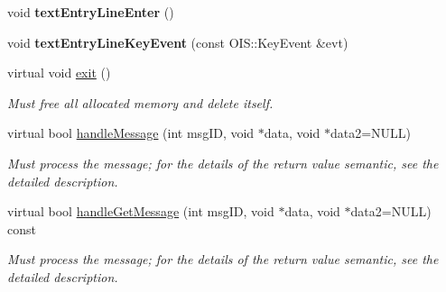\begin{DoxyCompactItemize}
\item 
\hypertarget{classComponentPlayer_a58c21cd8acfdd3244c7de3c7edd40e50}{
void {\bfseries text\-Entry\-Line\-Enter} ()}
\label{d5/d28/classComponentPlayer_a58c21cd8acfdd3244c7de3c7edd40e50}

\item 
\hypertarget{classComponentPlayer_ac450ea4fc6a7e8d9fb7d05b4cdcd2882}{
void {\bfseries text\-Entry\-Line\-Key\-Event} (const \-O\-I\-S\-::\-Key\-Event \&evt)}
\label{d5/d28/classComponentPlayer_ac450ea4fc6a7e8d9fb7d05b4cdcd2882}

\item 
\hypertarget{classComponentPlayer_ac4496f255396b1dbe6dfbc3b03c38b64}{
virtual void \hyperlink{classComponentPlayer_ac4496f255396b1dbe6dfbc3b03c38b64}{exit} ()}
\label{d5/d28/classComponentPlayer_ac4496f255396b1dbe6dfbc3b03c38b64}

\begin{DoxyCompactList}\small\item\em \-Must free all allocated memory and delete itself. \end{DoxyCompactList}\item 
virtual bool \hyperlink{classComponentPlayer_ac889012da1621a530330cedf9da5fd3c}{handle\-Message} (int msg\-I\-D, void $\ast$data, void $\ast$data2=\-N\-U\-L\-L)
\begin{DoxyCompactList}\small\item\em \-Must process the message; for the details of the return value semantic, see the detailed description. \end{DoxyCompactList}\item 
virtual bool \hyperlink{classComponentPlayer_a3df43bc31af62c1af4ba2c30ae9fe04f}{handle\-Get\-Message} (int msg\-I\-D, void $\ast$data, void $\ast$data2=\-N\-U\-L\-L) const 
\begin{DoxyCompactList}\small\item\em \-Must process the message; for the details of the return value semantic, see the detailed description. \end{DoxyCompactList}\end{DoxyCompactItemize}
